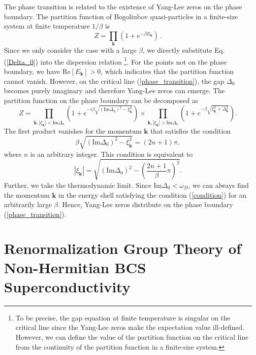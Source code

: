 \documentclass[aps,onecolumn,superscriptaddress,notitlepage,longbibliography]{revtex4-1}
\begin{document}
The phase transition is related to the existence of Yang-Lee zeros on the phase boundary. The partition function of Bogoliubov quasi-particles in a finite-size system at finite temperature $1/\beta$ is
\begin{equation}
  Z = \prod_{\bm{k}} (1 + e^{-\beta E_{\bm{k}}})\,.
\end{equation}
 Since we only consider the case with a large $\beta$, we directly substitute Eq. (\ref{Delta_0}) into the dispersion relation \footnote{To be precise, the gap equation at finite temperature is singular on the critical line since the Yang-Lee zeros make the expectation value ill-defined. However, we can define the value of the partition function on the critical line from the continuity of the partition function in a finite-size system.}. For the points not on the phase boundary, we have $\text{Re}
 [E_{\bm{k}}] > 0$, which indicates that the
 partition function cannot vanish. However, on the critical line (\ref{phase_transition}), the gap $\Delta_0$ becomes purely imaginary and therefore Yang-Lee zeros can emerge. The partition function on the phase boundary can be decomposed as
\begin{equation}
  Z = \prod_{\bm{k},|\xi_{\bm{k}}|<\text{Im}\Delta_0} \left( 1 + e^{- i \beta \sqrt{\left( \text{Im}\Delta_0 \right)^2 - \xi_{\bm{k}}^2}} \right)\times \prod_{\bm{k},|\xi_{\bm{k}}|>\text{Im}\Delta_0}\left( 1 + e^{- \beta \sqrt{\xi_{\bm{k}}^2 +\Delta_{\bm{k}}^2 }} \right).
\end{equation}
The first product vanishes for the momentum $\bm{k}$ that satisfies the condition
\begin{equation}
  \beta \sqrt{\left( \text{Im} \Delta_0 \right)^2 - \xi_{\bm{k}}^2} = (2n + 1) \pi,
\end{equation}
where $n$ is an arbitrary integer. This condition is equivalent to
\begin{equation}
 |\xi_{\bm{k}}| = \sqrt{\left( \text{Im} \Delta_0
  \right)^2 - \left( \frac{2 n + 1}{\beta} \pi \right)^2}.
  \label{condition}
\end{equation}
 Further, we take the thermodynamic limit. Since $\text{Im}\Delta_0<\omega_D$, we can always find the momentum $\bm{k}$ in the energy shell satisfying the condition (\ref{condition}) for an arbitrarily large $\beta$. Hence, Yang-Lee zeros distribute on the phase boundary (\ref{phase_transition}). 

 \section{Renormalization Group Theory of Non-Hermitian BCS Superconductivity}\label{RG}
\end{document}
